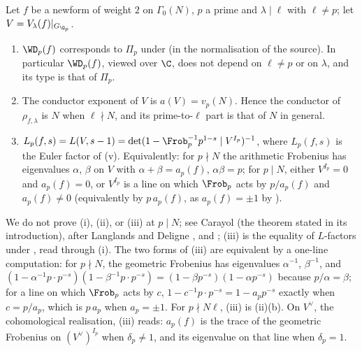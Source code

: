 \begin{theorem}\label{thm:modgalrep:carayol}
Let $f$ be a newform of weight $2$ on $\Gamma_0(N)$, $p$ a prime and $\lambda\mid\ell$ with $\ell\ne p$; let $V=V_\lambda(f)|_{G_{\Q_p}}$.
\begin{enumerate}[label=(\roman*)]
\item $\WD_p(f)$ corresponds to $\Pi_p$ under  (in the normalisation of the source). In particular $\WD_p(f)$, viewed
over $\C$, does not depend on $\ell\ne p$ or on $\lambda$, and its type is that of $\Pi_p$.
\item The conductor exponent of $V$ is $a(V)=v_p(N)$. Hence the conductor of $\rho_{f,\lambda}$ is $N$ when $\ell\nmid N$, and its prime-to-$\ell$ part is that of
$N$ in general.
\item $L_p(f,s)=L(V,s-1)=\det(1-\Frob_p^{-1}p^{1-s}\mid V^{I_p})^{-1}$, where $L_p(f,s)$ is the Euler factor of (v). Equivalently:
for $p\nmid N$ the arithmetic Frobenius has eigenvalues $\alpha$, $\beta$ on $V$ with $\alpha+\beta=a_p(f)$, $\alpha\beta=p$; for $p\mid N$, either $V^{I_p}=0$ and $a_p(f)=0$, or
$V^{I_p}$ is a line on which $\Frob_p$ acts by $p/a_p(f)$ and $a_p(f)\ne0$ (equivalently by $p\,a_p(f)$, as $a_p(f)=\pm1$ by ).
\end{enumerate}
\end{theorem}

We do not prove (i), (ii), or (iii) at $p\mid N$; see Carayol \cite{Carayol86} (the theorem stated in its introduction), after Langlands \cite{Langlands73} and
Deligne \cite{Deligne73}, and \cite[Theorem 3.1]{DDT}; (iii) is the equality of $L$-factors under , read through (i). The two forms
of (iii) are equivalent by a one-line computation:
for $p\nmid N$, the geometric Frobenius has eigenvalues $\alpha^{-1}$, $\beta^{-1}$, and $(1-\alpha^{-1}p\cdot p^{-s})(1-\beta^{-1}p\cdot p^{-s})=(1-\beta p^{-s})(1-\alpha p^{-s})$ because $p/\alpha=\beta$; for a
line on which $\Frob_p$ acts by $c$, $1-c^{-1}p\cdot p^{-s}=1-a_pp^{-s}$ exactly when $c=p/a_p$, which is $p\,a_p$ when $a_p=\pm1$. For $p\nmid N\ell$, (iii) is
(ii)(b). On $V^\vee$, the cohomological realisation, (iii) reads: $a_p(f)$ is the trace of the geometric
Frobenius on $(V^\vee)^{I_p}$ when $\delta_p\ne1$, and its eigenvalue on that line when $\delta_p=1$.

